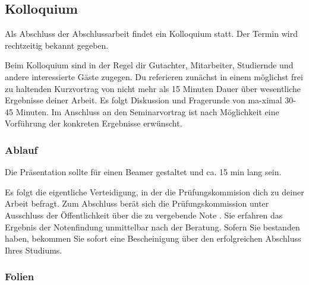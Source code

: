 \subsection{Kolloquium}

Als Abschluss der Abschlussarbeit findet ein Kolloquium statt. Der Termin wird rechtzeitig bekannt gegeben. 

Beim Kolloquium sind in der Regel dir Gutachter, Mitarbeiter, Studiernde  und andere interessierte Gäste zugegen. Du referieren zunächst in einem möglichst frei zu haltenden Kurzvortrag von nicht mehr als 15 Minuten Dauer über wesentliche Ergebnisse deiner Arbeit. Es folgt Diskussion und Fragerunde von ma-ximal 30- 45 Minuten. Im Anschluss an den Seminarvortrag ist nach Möglichkeit eine Vorführung der konkreten Ergebnisse erwünscht.


\subsubsection{Ablauf}

 Die Präsentation sollte für einen Beamer gestaltet und ca. 15 min lang sein.
 
Es folgt die eigentliche Verteidigung, in der die Prüfungskommision dich zu deiner Arbeit befragt. Zum Abschluss berät sich die Prüfungskommission  unter Ausschluss der Öffentlichkeit über die zu vergebende Note . Sie erfahren das Ergebnis der Notenfindung unmittelbar nach der Beratung. Sofern Sie bestanden haben, bekommen Sie sofort eine Bescheinigung über den erfolgreichen Abschluss Ihres Studiums. 

\subsubsection{Folien}

